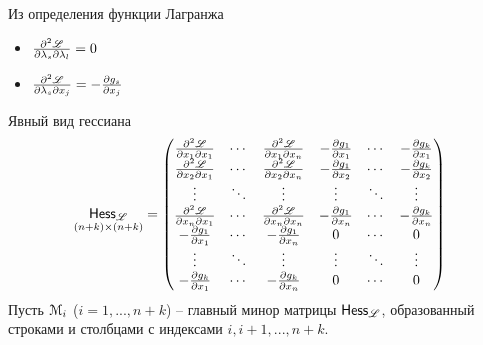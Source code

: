 Из определения функции Лагранжа
\begin{itemize}
	\item \(\frac{\partial^2 {\mathscr L}}{\partial \lambda_s\partial \lambda_l}=0\)
	\item \(\frac{\partial^2 {\mathscr L}}{\partial \lambda_s\partial x_j}=-\frac{\partial g_s}{\partial x_j}\)
\end{itemize}
Явный вид гессиана
\begin{equation}\label{BorderedHessian}
	\underset{(n+k)\times(n+k)}{\mathsf{Hess}_{\mathscr L}}=
	\begin{pmatrix} 
		\frac{\partial^2 {\mathscr L}}{\partial x_1\partial x_1} &  \cdots &
		\frac{\partial^2 {\mathscr L}}{\partial x_1\partial x_n} & -\frac{\partial g_1}{\partial x_1} & \cdots & 
		-\frac{\partial g_k}{\partial x_1} \\ 
		\frac{\partial^2 {\mathscr L}}{\partial x_2\partial x_1} &  \cdots &
		\frac{\partial^2 {\mathscr L}}{\partial x_2\partial x_n} & -\frac{\partial g_1}{\partial x_2} & \cdots & 
		-\frac{\partial g_k}{\partial x_2}\\
		\vdots & \ddots & \vdots & \vdots & \ddots & \vdots \\
		\frac{\partial^2 {\mathscr L}}{\partial x_n\partial x_1} & \cdots &
		\frac{\partial^2 {\mathscr L}}{\partial x_n\partial x_n}& -\frac{\partial g_1}{\partial x_n} & \cdots & 
		-\frac{\partial g_k}{\partial x_n}\\
		-\frac{\partial g_1}{\partial x_1} & \cdots &
		-\frac{\partial g_1}{\partial x_n} & 0 & \cdots & 0\\
		\vdots & \ddots & \vdots & \vdots & \ddots & \vdots\\
		-\frac{\partial g_k}{\partial x_1} &  \cdots &
		-\frac{\partial g_k}{\partial x_n} & 0 & \cdots & 0\\
	\end{pmatrix}
\end{equation}
Пусть ${\mathcal M}_{i}$ ($i=1,...,n+k$) -- главный минор матрицы $\mathsf{Hess}_{\mathscr L}$, 
образованный строками и столбцами с индексами $i,i+1,...,n+k$.

